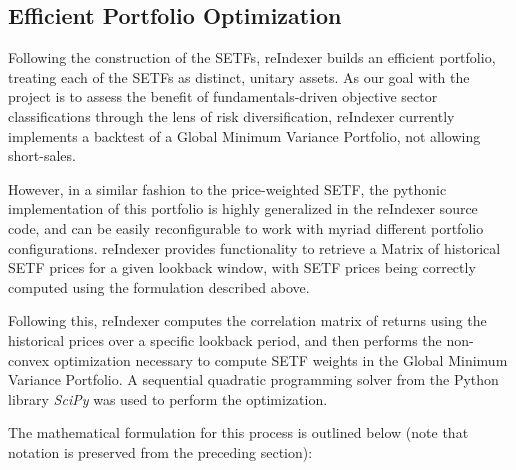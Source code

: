 \documentclass[../main.tex]{subfiles}
\begin{document}
\subsection{Efficient Portfolio Optimization} \label{candidate_universe_ranking:port_optim}

Following the construction of the SETFs, reIndexer builds an efficient portfolio, treating each of the SETFs as distinct, unitary assets. As our goal with the project is to assess the benefit of fundamentals-driven objective sector classifications through the lens of risk diversification, reIndexer currently implements a backtest of a Global Minimum Variance Portfolio, not allowing short-sales.

However, in a similar fashion to the price-weighted SETF, the pythonic implementation of this portfolio is highly generalized in the reIndexer source code, and can be easily reconfigurable to work with myriad different portfolio configurations. reIndexer provides functionality to retrieve a Matrix of historical SETF prices for a given lookback window, with SETF prices being correctly computed using the formulation described above.

Following this, reIndexer computes the correlation matrix of returns using the historical prices over a specific lookback period, and then performs the non-convex optimization necessary to compute SETF weights in the Global Minimum Variance Portfolio. A sequential quadratic programming solver from the Python library \textit{SciPy} was used to perform the optimization.

The mathematical formulation for this process is outlined below (note that notation is preserved from the preceding section):

\pagebreak
\end{document}
